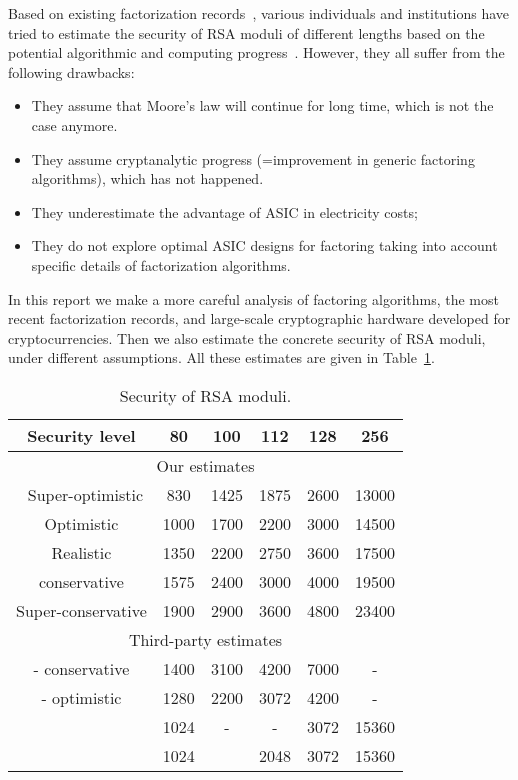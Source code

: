 \documentclass[a4paper]{article}
\begin{document}
Based on existing factorization records~\cite{DBLP:conf/eurocrypt/CavallarDLLMMRAGGLMMMPPZ00,DBLP:conf/crypto/KleinjungAFLTBGKMORTZ10,DBLP:journals/iacr/BaiTZ12,factor795}, various individuals and institutions have tried to estimate the security of RSA moduli of different lengths based on the potential algorithmic and computing progress~\cite{lenstra2001selecting,DBLP:conf/asiacrypt/LenstraTSKDHL03,lenstra2004key,abdalla2016algorithms,barker2016nist}. However, they all suffer from the following drawbacks:
\begin{itemize}
    \item They assume that Moore's law will continue for long time, which is not the case anymore.
    \item They assume cryptanalytic progress (=improvement in generic factoring algorithms), which has not happened.
    \item They underestimate the advantage of ASIC in electricity costs;
    \item They do not explore optimal ASIC designs for factoring taking into account specific details of factorization algorithms.
\end{itemize}
In this report we make a more careful analysis of factoring algorithms, the most recent factorization records, and large-scale cryptographic hardware developed for cryptocurrencies. Then we also estimate the concrete security of RSA moduli, under different assumptions. All these estimates are given in Table~\ref{tab:sec}.

\begin{table}[t]
    \centering
    \begin{tabular}{|c|c|c|c|c|c|}
        \hline 
        Security level &80 & 100 & 112 & 128 & 256   \\
        \hline\hline
        \multicolumn{6}{|c|}{Our estimates}\\\hline\
        Super-optimistic & 830 & 1425 & 1875 & 2600 &13000\\
        Optimistic& 1000 & 1700 & 2200 & 3000 & 14500\\
        Realistic & 1350 &2200 & 2750& 3600 & 17500\\
        conservative & 1575 & 2400&3000& 4000 & 19500\\
        Super-conservative& 1900 & 2900 &3600& 4800 & 23400\\         \hline\hline
        \multicolumn{6}{|c|}{Third-party estimates}\\\hline
        \cite{lenstra2004key} - conservative & 1400 & 3100 & 4200 & 7000&-\\
        \cite{lenstra2004key} - optimistic & 1280 & 2200 & 3072 & 4200&-\\
        \cite{abdalla2016algorithms} & 1024 &-&-&3072 & 15360\\
        \cite{barker2016nist}&1024 &&2048&3072 &15360\\\hline
    \end{tabular}
    \caption{Security of RSA moduli.}
    \label{tab:sec}
\end{table}
\end{document}
